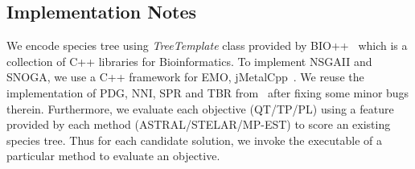 \subsection{Implementation Notes}
We encode species tree using \textit{TreeTemplate} class provided by BIO++~\cite{gueguen2013bpp} which is a collection of C++ libraries for Bioinformatics. To implement NSGAII and SNOGA, we use a C++ framework for EMO, jMetalCpp~\cite{lopez2013jmetalcpp}. We reuse the implementation of PDG, NNI, SPR and TBR from~\cite{zambrano2016mo} after fixing some minor bugs therein. Furthermore, we evaluate each objective (QT/TP/PL) using a feature provided by each method (ASTRAL/STELAR/MP-EST) to score an existing species tree. Thus for each candidate solution, we invoke the executable of a particular method to evaluate an objective.
\begin{comment}
\subsection{Objective Evaluation}
Each method (ASTRAL, STELAR or MP-EST) provides an option to score an existing species tree. We used this feature to enable to evaluate the objectives. Thus for each candidate species tree, we invoke the executable of a particular method (ASTRAL/STELAR/MP-EST) to evaluate an objective. %
\end{comment}